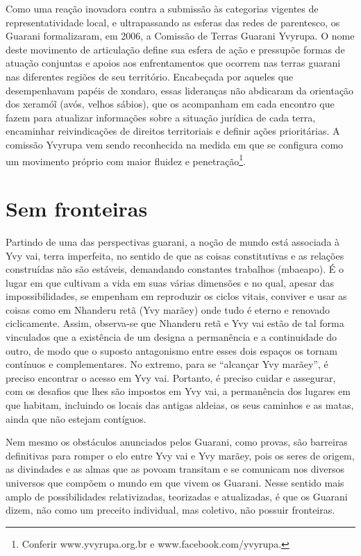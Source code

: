 {{Como uma reação inovadora contra a submissão às categorias vigentes de
representatividade local, e ultrapassando as esferas das redes de
parentesco, os Guarani formalizaram, em 2006, a Comissão de Terras
Guarani Yvyrupa.  O nome deste movimento de articulação define sua
esfera de ação e pressupõe formas de atuação conjuntas e apoios aos
enfrentamentos que ocorrem nas terras guarani nas diferentes regiões de
seu território. Encabeçada por aqueles que desempenhavam papéis de
xondaro, essas lideranças não abdicaram da orientação dos
xeramóĩ (avós, velhos sábios), que os acompanham
em cada encontro que fazem para atualizar informações sobre a situação
jurídica de cada terra, encaminhar reivindicações de direitos
territoriais e definir ações prioritárias. A comissão Yvyrupa vem sendo
reconhecida na medida em que se configura como um movimento próprio com
maior fluidez e penetração\footnote{Conferir www.yvyrupa.org.br e
www.facebook.com/yvyrupa.}. 

\section{Sem fronteiras}

Partindo de uma das perspectivas guarani, a noção de mundo está
associada à Yvy vai, terra imperfeita, no sentido de que as coisas
constitutivas e as relações construídas não são estáveis, demandando
constantes trabalhos (mbaeapo). É o lugar em que cultivam a vida em
suas várias dimensões e no qual, apesar das impossibilidades, se
empenham em reproduzir os ciclos vitais, conviver e usar as coisas como
em Nhanderu retã (Yvy marãey) onde tudo é eterno e renovado
ciclicamente. Assim, observa-se que Nhanderu retã e Yvy vai estão de
tal forma vinculados que a existência de um designa a permanência e a
continuidade do outro, de modo que o suposto antagonismo entre esses
dois espaços os tornam contínuos e complementares. No extremo, para se
``alcançar Yvy marãey'', é preciso encontrar o acesso em Yvy vai.
Portanto, é preciso cuidar e assegurar, com os desafios que lhes são
impostos em Yvy vai, a permanência dos lugares em que habitam,
incluindo os locais das antigas aldeias, os seus caminhos e as matas,
ainda que não estejam contíguos. 

Nem mesmo os obstáculos anunciados pelos Guarani, como provas, são
barreiras definitivas para romper o elo entre Yvy vai e Yvy marãey,
pois os seres de origem, as divindades e as almas que as povoam
transitam e se comunicam nos diversos universos que compõem o mundo em
que vivem os Guarani. Nesse sentido mais amplo de possibilidades
relativizadas, teorizadas e atualizadas, é que os Guarani dizem, não
como um preceito individual, mas coletivo, não possuir fronteiras.

}}
